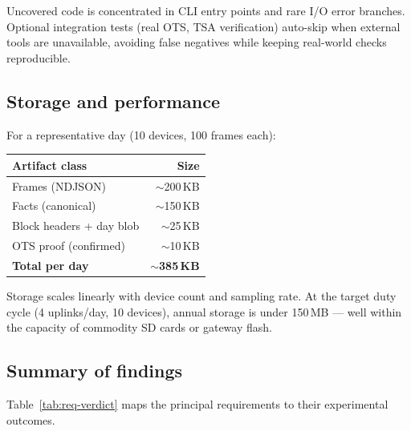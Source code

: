 Uncovered code is concentrated in \ac{CLI} entry points and rare I/O error
branches.
Optional integration tests (real \ac{OTS}, \ac{TSA} verification)
auto-skip when external tools are unavailable, avoiding false
negatives while keeping real-world checks reproducible.

\subsection{Storage and performance}

For a representative day (10 devices, 100 frames each):

\begin{center}
    \small
    \begin{tabular}{lr}
        \toprule
        \textbf{Artifact class} & \textbf{Size} \\
        \midrule
        Frames (ND\ac{JSON})         & $\sim$200\,KB \\
        Facts (canonical)       & $\sim$150\,KB \\
        Block headers + day blob& $\sim$25\,KB \\
        \ac{OTS} proof (confirmed)   & $\sim$10\,KB \\
        \midrule
        \textbf{Total per day}  & \textbf{$\sim$385\,KB} \\
        \bottomrule
    \end{tabular}
\end{center}

Storage scales linearly with device count and sampling rate.
At
the target duty cycle (4 uplinks/day, 10 devices), annual storage
is under 150\,MB — well within the capacity of commodity SD cards
or gateway flash.

\subsection{Summary of findings}

Table~\ref{tab:req-verdict} maps the principal requirements to their
experimental outcomes.

